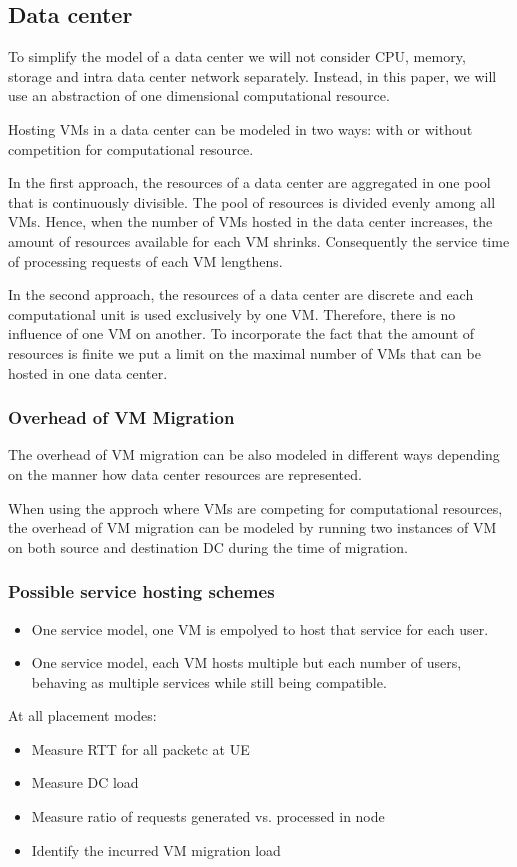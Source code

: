 \subsection{Data center}
To simplify the model of a data center we will not consider CPU, memory, storage and intra data center network separately.
Instead, in this paper, we will use an abstraction of one dimensional computational resource.

Hosting VMs in a data center can be modeled in two ways: with or without competition for computational resource.

In the first approach, the resources of a data center are aggregated in one pool that is continuously divisible.
The pool of resources is divided evenly among all VMs.
Hence, when the number of VMs hosted in the data center increases, the amount of resources available for each VM shrinks.
Consequently the service time of processing requests of each VM lengthens.

In the second approach, the resources of a data center are discrete and each computational unit is used exclusively by one VM.
Therefore, there is no influence of one VM on another.
To incorporate the fact that the amount of resources is finite we put a limit on the maximal number of VMs that can be hosted in one data center.

\subsubsection{Overhead of VM Migration}
The overhead of VM migration can be also modeled in different ways depending on the manner how data center resources are represented.

When using the approch where VMs are competing for computational resources, the overhead of VM migration can be modeled by running two instances of VM on both source and destination DC during the time of migration. 

\subsubsection{Possible service hosting schemes}

\begin{itemize}
\item One service model, one VM is empolyed to host that service for each user.
\item One service model, each VM hosts multiple but each number of users, behaving as multiple services while still being compatible.
\end{itemize}


At all placement modes:
\begin{itemize}
\item Measure RTT for all packetc at UE
\item Measure DC load
\item Measure ratio of requests generated vs. processed in \xcloud node
\item Identify the incurred VM migration load
\end{itemize}